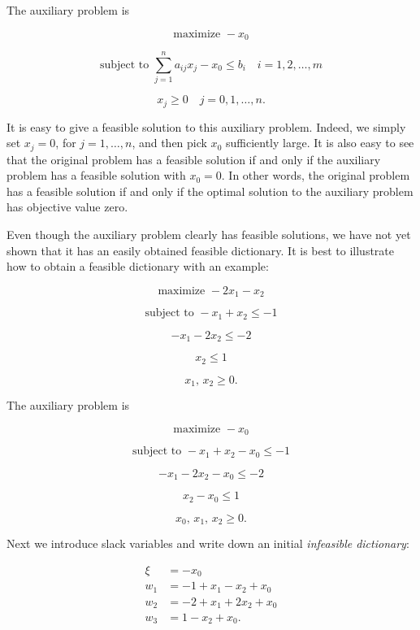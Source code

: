 \documentclass{article}
\begin{document}
    The auxiliary problem is

    \[
    \text{maximize } -x_0
    \]
    
    \[
    \text{subject to } \sum_{j=1}^{n} a_{ij}x_j - x_0 \leq b_i \quad i = 1, 2, \ldots, m
    \]
    
    \[
    x_j \geq 0 \quad j = 0, 1, \ldots, n.
    \]
    
    It is easy to give a feasible solution to this auxiliary problem. Indeed, we simply set \( x_j = 0 \), for \( j = 1, \ldots, n \), and then pick \( x_0 \) sufficiently large. It is also easy to see that the original problem has a feasible solution if and only if the auxiliary problem has a feasible solution with \( x_0 = 0 \). In other words, the original problem has a feasible solution if and only if the optimal solution to the auxiliary problem has objective value zero.
    
    Even though the auxiliary problem clearly has feasible solutions, we have not yet shown that it has an easily obtained feasible dictionary. It is best to illustrate how to obtain a feasible dictionary with an example:
    
    \[
    \text{maximize } -2x_1 - x_2
    \]
    
    \[
    \text{subject to } -x_1 + x_2 \leq -1
    \]
    
    \[
    -x_1 - 2x_2 \leq -2
    \]
    
    \[
    x_2 \leq 1
    \]
    
    \[
    x_1, \, x_2 \geq 0.
    \]
    
    The auxiliary problem is
    
    \[
    \text{maximize } -x_0
    \]
    
    \[
    \text{subject to } -x_1 + x_2 - x_0 \leq -1
    \]
    
    \[
    -x_1 - 2x_2 - x_0 \leq -2
    \]
    
    \[
    x_2 - x_0 \leq 1
    \]
    
    \[
    x_0, \, x_1, \, x_2 \geq 0.
    \]
    
    Next we introduce slack variables and write down an initial \emph{infeasible dictionary}:
    
    \[
    \begin{split}
    \xi &= -x_0 \\
    w_1 &= -1 + x_1 - x_2 + x_0 \\
    w_2 &= -2 + x_1 + 2x_2 + x_0 \\
    w_3 &= 1 - x_2 + x_0.
    \end{split}
    \]
    
\end{document}
